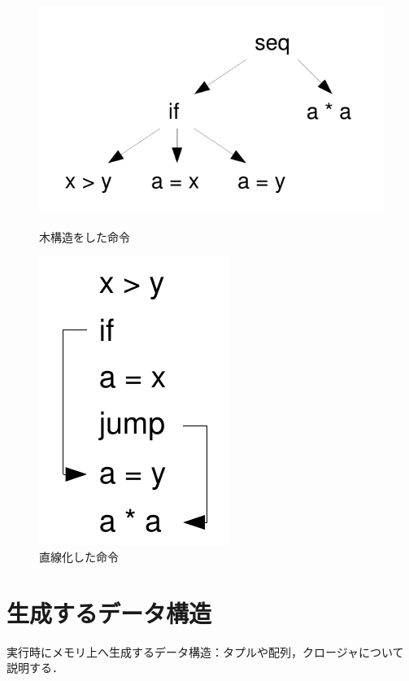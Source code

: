 \documentclass[a4paper,titlepage,disablejfam]{jsbook}
\begin{document}
\begin{figure}[htb]
\begin{minipage}{0.5\hsize}
 \begin{center}
  \includegraphics[scale=0.6]{instree.pdf}
  \caption{木構造をした命令}\label{fig:impl-instree}
 \end{center}
\end{minipage}
\begin{minipage}{0.5\hsize}
 \begin{center}
  \includegraphics[scale=0.6]{insliner.pdf}
  \caption{直線化した命令}\label{fig:impl-insliner}
 \end{center}
\end{minipage}
\end{figure}


\section{生成するデータ構造}\label{sc:impl-data-structure}%
 実行時にメモリ上へ生成するデータ構造：タプルや配列，クロージャについて
 説明する．
\end{document}
